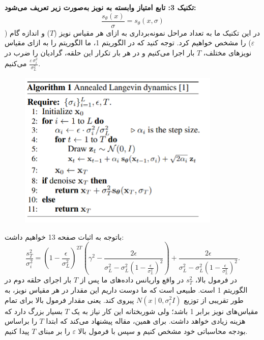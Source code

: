\documentclass[12pt]{article}
\begin{document}
\begin{enumerate}
\begin{enumerate}
{        \textbf{تکنیک 3: تابع امتیاز وابسته به نویز به‌صورت زیر تعریف می‌شود:}\\
        $$
        \frac{s_\theta(x)}{\sigma} = s_\theta(x, \sigma)
        $$
        در این تکنیک ما به تعداد مراحل نمونه‌برداری به ازای هر مقیاس نویز ($T$) و اندازه گام ($\varepsilon$) را مشخص خواهیم کرد. توجه کنید که در الگوریتم 1، ما الگوریتم  را به ازای مقیاس نویزهای مختلف، $T$ بار اجرا می‌کنیم و در هر بار تکرار این حلقه، گرادیان را ضرب در $\frac{\varepsilon \, \sigma_i^2}{\sigma_L^2}$
        می‌کنیم.
        \begin{figure}[h]
            \centering
            \includegraphics[width=\textwidth]{figs/Q1_3.png}
            \label{fig:q1_3}  
        \end{figure}
        باتوجه به اثبات صفحه 13 خواهیم داشت:
        $$
        \frac{s_T^2}{\sigma_i^2}=\left(1-\frac{\epsilon}{\sigma_L^2}\right)^{2 T}\left(\gamma^2-\frac{2 \epsilon}{\sigma_L^2-\sigma_L^2\left(1-\frac{\epsilon}{\sigma_L^2}\right)^2}\right)+\frac{2 \epsilon}{\sigma_L^2-\sigma_L^2\left(1-\frac{\epsilon}{\sigma_L^2}\right)^2} .
        $$
        در فرمول بالا، $s_T^2$ در واقع واریانس داده‌های ما پس از $T$ بار اجرای حلقه دوم در الگوریتم 1 است. طبیعی است که ما دوست داریم این مقدار در هر مقیاس نویز، به طور تقریبی از توزیع  $N(x \mid 0, \sigma_i^2 I)$ 
        پیروی کند. یعنی مقدار فرمول بالا برای تمام مقیاس‌های نویز برابر 1 باشد؛ ولی شوربختانه این کار نیاز به یک $T$ بسیار بزرگ دارد که هزینه زیادی خواهد داشت. برای همین، مقاله پیشنهاد می‌کند که ابتدا $T$ را براساس بودجه محاسباتی خود مشخص کنیم و سپس با فرمول بالا $\varepsilon$ را بر مبنای $T$ پیدا کنیم.\\
}
\end{enumerate}
\end{enumerate}
\end{document}
